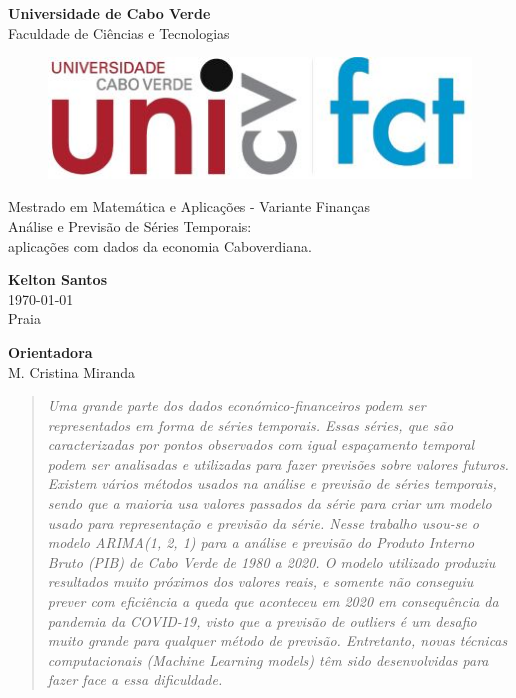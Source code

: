 \begin{titlepage}
\begin{center}
\LARGE{\textbf{Universidade de Cabo Verde}}\\
\normalsize{Faculdade de Ciências e Tecnologias}\\[0.3cm]

\begin{figure}[h!]
    \centering
    \includegraphics[width=.3\linewidth]{img/hpi_logo.jpg}
\end{figure}
\vspace{4cm}

\LARGE{Mestrado em Matemática e Aplicações - Variante Finanças}\\[0.7cm]
\Huge{Análise e Previsão de Séries Temporais:\\ aplicações com dados da economia Caboverdiana.}

\vspace{3cm} 

\Large{\textbf{Kelton Santos}} \\[3pt]  
\vspace{0.5cm}
\large{\today} \\
Praia

\vspace{1cm}

\large{\textbf{Orientadora}}\\
M. Cristina Miranda\\
\vspace{0.5cm}
\end{center}
\end{titlepage}


\thispagestyle{empty}


\begin{abstract}
\justify 
\emph{Uma grande parte dos dados económico-financeiros podem ser representados em forma de séries temporais. Essas séries, que são caracterizadas por pontos observados com igual espaçamento temporal podem ser analisadas e utilizadas para fazer previsões sobre valores futuros. Existem vários métodos usados na análise e previsão de séries temporais, sendo que a maioria usa valores passados da série para criar um modelo usado para representação e previsão da série. Nesse trabalho usou-se o modelo ARIMA(1, 2, 1) para a análise e previsão do Produto Interno Bruto (PIB) de Cabo Verde de 1980 a 2020. O modelo utilizado produziu resultados muito próximos dos valores reais, e somente não conseguiu prever com eficiência a queda que aconteceu em 2020 em consequência da pandemia da COVID-19, visto que a  previsão de outliers é um desafio muito grande para qualquer método de previsão. Entretanto, novas técnicas computacionais (Machine Learning models) têm sido desenvolvidas para fazer face a essa dificuldade.}
\end{abstract}

% 
% 

\setcounter{page}{1}
